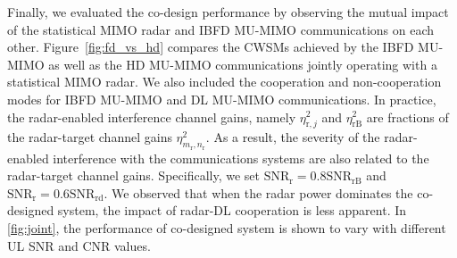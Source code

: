 \documentclass[10pt,journal]{IEEEtran}
\newcommand{\paren}[1]{\left({#1}\right)}
\newcommand{\rr}{_\mathrm{r}}
\theoremstyle{definition}
\begin{document}

		Finally, we evaluated the co-design performance by observing the mutual impact of the statistical MIMO radar and IBFD MU-MIMO communications on each other. Figure~\ref{fig:fd_vs_hd} compares the CWSMs achieved by the IBFD MU-MIMO as well as the HD MU-MIMO communications jointly operating with a statistical MIMO radar. We also included the cooperation and non-cooperation modes for IBFD MU-MIMO and DL MU-MIMO communications. In practice, the radar-enabled interference channel gains, namely $\eta^2_{\mathrm{r},j}$ and $\eta^2_{\mathrm{rB}}$ are fractions of the radar-target channel gains $\eta^2_{m\rr,n\rr}$. As a result, the severity of the radar-enabled interference with the communications systems are also related to the radar-target channel gains. Specifically, we set $\mathrm{SNR}_{\textrm{r}}=0.8\mathrm{SNR}_{\textrm{rB}}$ and $\mathrm{SNR}_{\textrm{r}}=0.6\mathrm{SNR}_{\textrm{rd}}$. We observed that when the radar power dominates the co-designed system, the impact of radar-DL cooperation is less apparent. In \figurename{\;\ref{fig:joint}}, the performance of co-designed system is shown to vary with different UL SNR and CNR values.  %
\end{document}

